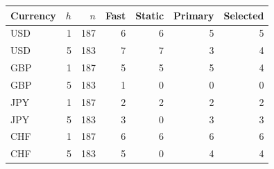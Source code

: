 \begin{tabular}{@{}lrrrrrr@{}}\toprule
Currency & $h$ & $n$ & Fast & Static & Primary & Selected\\\midrule
USD & 1 & 187 & 6 & 6 & 5 & 5\\
USD & 5 & 183 & 7 & 7 & 3 & 4\\
GBP & 1 & 187 & 5 & 5 & 5 & 4\\
GBP & 5 & 183 & 1 & 0 & 0 & 0\\
JPY & 1 & 187 & 2 & 2 & 2 & 2\\
JPY & 5 & 183 & 3 & 0 & 3 & 3\\
CHF & 1 & 187 & 6 & 6 & 6 & 6\\
CHF & 5 & 183 & 5 & 0 & 4 & 4\\
\bottomrule\end{tabular}
